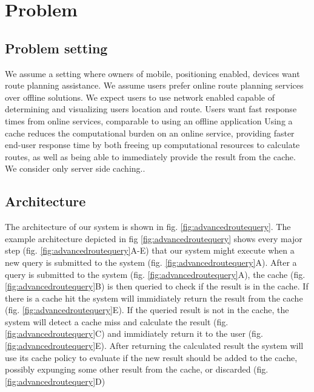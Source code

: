 \section{Problem}\label{sec:problemdef}

\subsection{Problem setting}\label{subsec:probset}
We assume a setting where owners of mobile, positioning enabled, devices want route planning assistance. We assume users prefer online route planning services over offline solutions. 
We expect users to use network enabled capable of determining and visualizing users location and route.
Users want fast response times from online services, comparable to using an offline application \cite{ref}
Using a cache reduces the computational burden \cite{ref} on an online service, providing faster end-user response time \cite{ref} by both freeing up computational resources to calculate \spath routes, as well as being able to immediately provide the \spath result from the cache.
We consider only server side caching..



\subsection{Architecture}\label{sec:architec}

The architecture of our system is shown in fig. \ref{fig:advancedroutequery}. The example architecture depicted in fig \ref{fig:advancedroutequery} shows every major step (fig. \ref{fig:advancedroutequery}A-E) that our system might execute when a new \spath query is submitted to the system (fig. \ref{fig:advancedroutequery}A). After a \spath query is submitted to the system (fig. \ref{fig:advancedroutequery}A), the cache (fig. \ref{fig:advancedroutequery}B) is then queried to check if the result is in the cache. If there is a cache hit the system will immidiately return the result from the cache (fig. \ref{fig:advancedroutequery}E). If the queried \spath result is not in the cache, the system will detect a cache miss and calculate the result (fig. \ref{fig:advancedroutequery}C) and immidiately return it to the user (fig. \ref{fig:advancedroutequery}E). After returning the calculated result the system will use its cache policy to evaluate if the new result should be added to the cache, possibly expunging some other result from the cache, or discarded (fig. \ref{fig:advancedroutequery}D)


